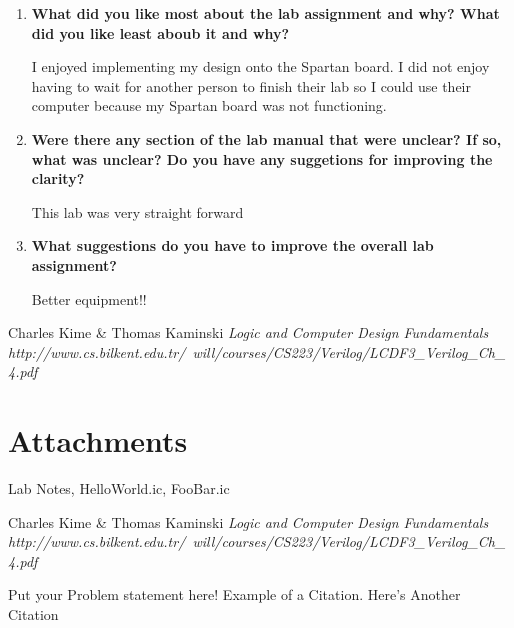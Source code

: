 \documentclass[a4paper,12pt]{article}
\begin{document}
\begin{enumerate}
  \item \textbf{What did you like most about the lab assignment and why? What did you like least aboub it and why?}
  \vspace{10pt}

  I enjoyed implementing my design onto the Spartan board. I did not enjoy having
  to wait for another person to finish their lab so I could use their computer
  because my Spartan board was not functioning.

  \item \textbf{Were there any section of the lab manual that were unclear? If so, what was unclear? Do you have any suggetions for improving the clarity?}
  \vspace{10pt}

  This lab was very straight forward

  \item \textbf{What suggestions do you have to improve the overall lab assignment?}
  \vspace{10pt}

  Better equipment!!

\end{enumerate}

\ifx
\begin{thebibliography}{1}
 Charles Kime \& Thomas Kaminski  \emph{Logic and Computer Design Fundamentals} \\ \hspace{15pt}\textit{http://www.cs.bilkent.edu.tr/~will/courses/CS223/Verilog/LCDF3_Verilog_Ch_4.pdf}
\end{thebibliography}

\section*{Attachments}
Lab Notes, HelloWorld.ic, FooBar.ic

\begin{thebibliography}{9}
 Charles Kime & Thomas Kaminski  \emph{Logic and Computer Design Fundamentals} \textit{http://www.cs.bilkent.edu.tr/~will/courses/CS223/Verilog/LCDF3_Verilog_Ch_4.pdf}
\end{thebibliography}

Put your Problem statement here! Example of a Citation\cite[p.219]{Robotics}. Here's Another Citation\cite{Flueck}
\fi
\end{document}
